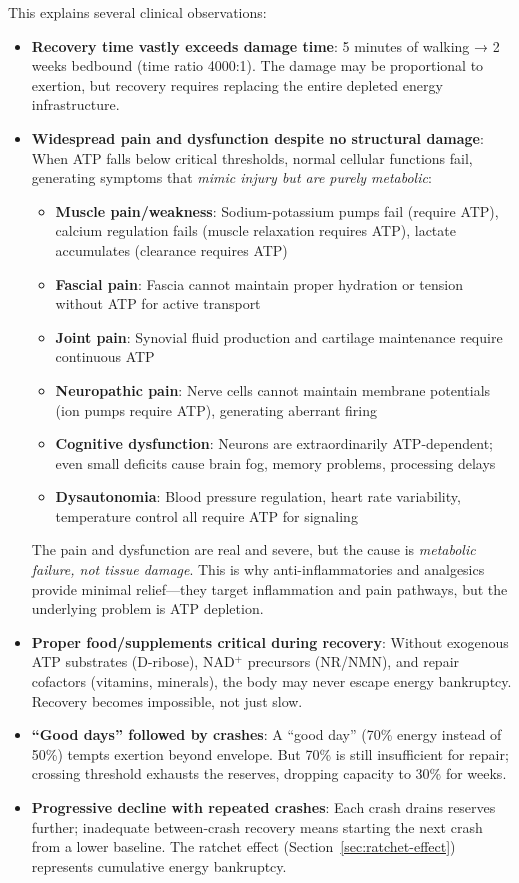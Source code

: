 This explains several clinical observations:
\begin{itemize}
    \item \textbf{Recovery time vastly exceeds damage time}: 5 minutes of walking → 2 weeks bedbound (time ratio 4000:1). The damage may be proportional to exertion, but recovery requires replacing the entire depleted energy infrastructure.

    \item \textbf{Widespread pain and dysfunction despite no structural damage}: When ATP falls below critical thresholds, normal cellular functions fail, generating symptoms that \textit{mimic injury but are purely metabolic}:
    \begin{itemize}
        \item \textbf{Muscle pain/weakness}: Sodium-potassium pumps fail (require ATP), calcium regulation fails (muscle relaxation requires ATP), lactate accumulates (clearance requires ATP)
        \item \textbf{Fascial pain}: Fascia cannot maintain proper hydration or tension without ATP for active transport
        \item \textbf{Joint pain}: Synovial fluid production and cartilage maintenance require continuous ATP
        \item \textbf{Neuropathic pain}: Nerve cells cannot maintain membrane potentials (ion pumps require ATP), generating aberrant firing
        \item \textbf{Cognitive dysfunction}: Neurons are extraordinarily ATP-dependent; even small deficits cause brain fog, memory problems, processing delays
        \item \textbf{Dysautonomia}: Blood pressure regulation, heart rate variability, temperature control all require ATP for signaling
    \end{itemize}
    The pain and dysfunction are real and severe, but the cause is \textit{metabolic failure, not tissue damage}. This is why anti-inflammatories and analgesics provide minimal relief---they target inflammation and pain pathways, but the underlying problem is ATP depletion.

    \item \textbf{Proper food/supplements critical during recovery}: Without exogenous ATP substrates (D-ribose), NAD$^+$ precursors (NR/NMN), and repair cofactors (vitamins, minerals), the body may never escape energy bankruptcy. Recovery becomes impossible, not just slow.

    \item \textbf{``Good days'' followed by crashes}: A ``good day'' (70\% energy instead of 50\%) tempts exertion beyond envelope. But 70\% is still insufficient for repair; crossing threshold exhausts the reserves, dropping capacity to 30\% for weeks.

    \item \textbf{Progressive decline with repeated crashes}: Each crash drains reserves further; inadequate between-crash recovery means starting the next crash from a lower baseline. The ratchet effect (Section~\ref{sec:ratchet-effect}) represents cumulative energy bankruptcy.
\end{itemize}

